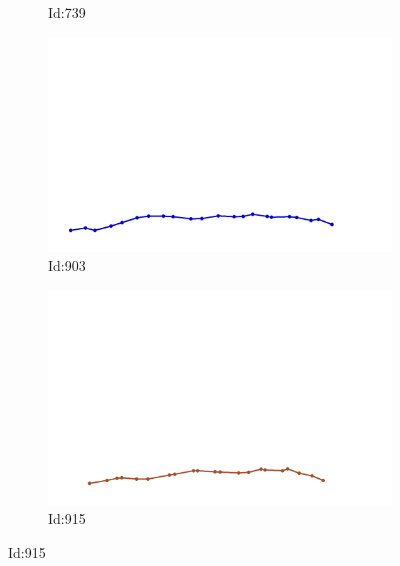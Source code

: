 \documentclass[12pt,twoside]{report}
\begin{document}
\begin{figure}
\begin{subfigure}[b]{0.20\textwidth}
\caption{Id:739}
\end{subfigure}
\begin{subfigure}[b]{0.20\textwidth}
\centering
\includegraphics[width=\textwidth]{../../trajectories/903.png}
\caption{Id:903}
\end{subfigure}
\begin{subfigure}[b]{0.20\textwidth}
\centering
\includegraphics[width=\textwidth]{../../trajectories/915.png}
\caption{Id:915}
\end{subfigure}
\end{figure}
\end{document}
